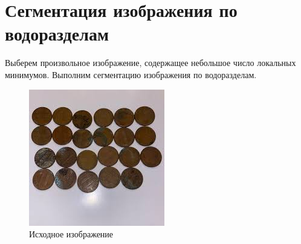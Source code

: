 \section{Сегментация изображения по водоразделам}

Выберем произвольное изображение, содержащее небольшое число локальных минимумов. Выполним сегментацию изображения по водоразделам.

\begin{figure}[H]
    \includegraphics[width=\textwidth]{../source/2.png}
    \caption{Исходное изображение}
\end{figure}

